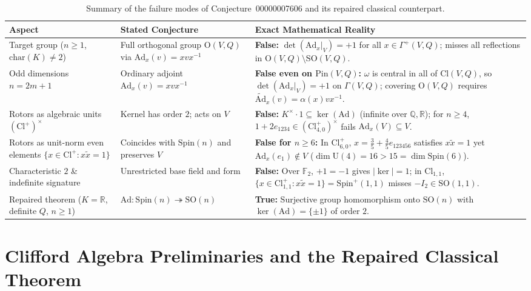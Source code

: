 \documentclass[11pt]{article}
\theoremstyle{definition}
\theoremstyle{remark}
\newcommand{\Cl}{\mathrm{Cl}}
\newcommand{\Spin}{\mathrm{Spin}}
\newcommand{\Pin}{\mathrm{Pin}}
\newcommand{\Ad}{\mathrm{Ad}}
\newcommand{\tAd}{\widetilde{\mathrm{Ad}}}
\newcommand{\SO}{\mathrm{SO}}
\newcommand{\Orth}{\mathrm{O}}
\begin{document}
\begin{table}[ht]
\centering
\small
\renewcommand{\arraystretch}{1.22}
\begin{tabular}{@{}>{\raggedright\arraybackslash}p{}>{\raggedright\arraybackslash}p{}>{\raggedright\arraybackslash}p{}@{}}
\toprule
\textbf{Aspect} & \textbf{Stated Conjecture} & \textbf{Exact Mathematical Reality} \\
\midrule
Target group ($n \ge 1$, $\mathrm{char}(K) \ne 2$) &
Full orthogonal group $\Orth(V,Q)$ via $\Ad_x(v) = x v x^{-1}$ &
\textbf{False:} $\det(\Ad_x|_V) = +1$ for all $x \in \Gamma^+(V,Q)$; misses all reflections in $\Orth(V,Q) \setminus \SO(V,Q)$. \\
Odd dimensions $n = 2m + 1$ &
Ordinary adjoint $\Ad_x(v) = x v x^{-1}$ &
\textbf{False even on $\Pin(V,Q)$:} $\omega$ is central in all of $\Cl(V,Q)$, so $\det(\Ad_x|_V) = +1$ on $\Gamma(V,Q)$; covering $\Orth(V,Q)$ requires $\tAd_x(v) = \alpha(x) v x^{-1}$. \\
Rotors as algebraic units $(\Cl^+)^\times$ &
Kernel has order $2$; acts on $V$ &
\textbf{False:} $K^\times \cdot 1 \subseteq \ker(\Ad)$ (infinite over $\mathbb{Q},\mathbb{R}$); for $n \ge 4$, $1 + 2 e_{1234} \in (\Cl_{4,0}^+)^\times$ fails $\Ad_x(V) \subseteq V$. \\
Rotors as unit-norm even elements $\{x \in \Cl^+ : x \widetilde{x} = 1\}$ &
Coincides with $\Spin(n)$ and preserves $V$ &
\textbf{False for $n \ge 6$:} In $\Cl_{6,0}^+$, $x = \frac{3}{5} + \frac{4}{5} e_{123456}$ satisfies $x \widetilde{x} = 1$ yet $\Ad_x(e_1) \notin V$ ($\dim \mathrm{U}(4) = 16 > 15 = \dim \Spin(6)$). \\
Characteristic $2$ \& indefinite signature &
Unrestricted base field and form &
\textbf{False:} Over $\mathbb{F}_2$, $+1 = -1$ gives $|\ker| = 1$; in $\Cl_{1,1}$, $\{x \in \Cl_{1,1}^+ : x \widetilde{x} = 1\} = \Spin^+(1,1)$ misses $-I_2 \in \SO(1,1)$. \\
Repaired theorem ($K = \mathbb{R}$, definite $Q$, $n \ge 1$) &
$\Ad : \Spin(n) \twoheadrightarrow \SO(n)$ &
\textbf{True:} Surjective group homomorphism onto $\SO(n)$ with $\ker(\Ad) = \{\pm 1\}$ of order $2$. \\
\bottomrule
\end{tabular}
\caption{Summary of the failure modes of Conjecture~00000007606 and its repaired classical counterpart.}
\label{tab:summary}
\end{table}

\section{Clifford Algebra Preliminaries and the Repaired Classical Theorem}
\end{document}

